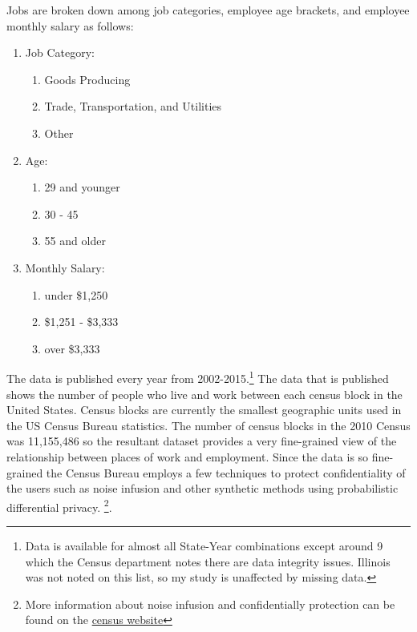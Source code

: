 \documentclass{article}
\theoremstyle{definition}
\theoremstyle{remark}
\newcommand\fnurl[2]{%
\href{#2}{#1}%
}
\begin{document}
Jobs are broken down among job categories, employee age brackets, and employee monthly salary as follows:
\begin{enumerate}
\item Job Category:
    \begin{enumerate}
        \item Goods Producing
        \item Trade, Transportation, and Utilities
        \item Other
    \end{enumerate}
\item Age:
    \begin{enumerate}
        \item 29 and younger
        \item 30 - 45
        \item 55 and older
    \end{enumerate}
\item Monthly Salary:
    \begin{enumerate}
        \item under \$1,250
        \item \$1,251 - \$3,333
        \item over \$3,333
    \end{enumerate}
\end{enumerate}

The data is published every year from 2002-2015.\footnote{Data is available for almost all State-Year combinations except around 9 which the Census department notes there are data integrity issues.  Illinois was not noted on this list, so my study is unaffected by missing data.}  The data that is published shows the number of people who live and work between each census block in the United States.  Census blocks are currently the smallest geographic units used in the US Census Bureau statistics.  The number of census blocks in the 2010 Census was 11,155,486 so the resultant dataset provides a very fine-grained view of the relationship between places of work and employment.  Since the data is so fine-grained the Census Bureau employs a few techniques to protect confidentiality of the users such as noise infusion and other synthetic methods using probabilistic differential privacy. \footnote{More information about noise infusion and confidentially protection can be found on the \fnurl{census website}{https://www2.census.gov/ces/wp/2014/CES-WP-14-30.pdf}}.\\
\end{document}
